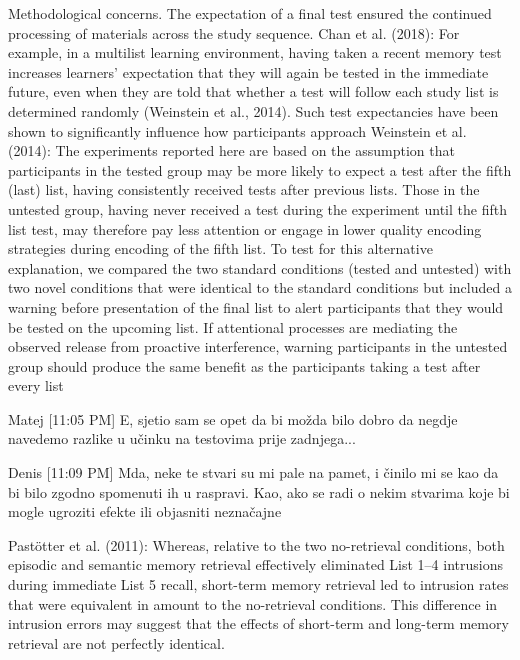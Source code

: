 \documentclass[../main.tex]{subfiles}
\begin{document}
Methodological concerns. The expectation of a final test ensured the
continued processing of materials across the study sequence.
Chan et al. (2018): %
For example, in a multilist learning environment, having taken a
recent memory test increases learners’ expectation that they will
again be tested in the immediate future, even when they are told
that whether a test will follow each study list is determined
randomly (Weinstein et al., 2014). Such test expectancies have
been shown to significantly influence how participants approach
Weinstein et al. (2014):
The experiments reported here are based on the assumption that
participants in the tested group may be more likely to expect a test
after the fifth (last) list, having consistently received tests after
previous lists. Those in the untested group, having never received
a test during the experiment until the fifth list test, may therefore
pay less attention or engage in lower quality encoding strategies
during encoding of the fifth list. To test for this alternative explanation, 
we compared the two standard conditions (tested and
untested) with two novel conditions that were identical to the
standard conditions but included a warning before presentation of
the final list to alert participants that they would be tested on the
upcoming list. If attentional processes are mediating the observed
release from proactive interference, warning participants in the
untested group should produce the same benefit as the participants
taking a test after every list


Matej [11:05 PM]
E, sjetio sam se opet da bi možda bilo dobro da negdje navedemo razlike u učinku na testovima prije zadnjega...

Denis [11:09 PM]
Mda, neke te stvari su mi pale na pamet, i činilo mi se kao da bi bilo zgodno spomenuti ih u raspravi. Kao, ako se radi o nekim stvarima koje bi mogle ugroziti efekte ili objasniti neznačajne



Pastötter et al. (2011):
Whereas, relative to the two no-retrieval conditions,
both episodic and semantic memory retrieval effectively
eliminated List 1–4 intrusions during immediate List 5 recall,
short-term memory retrieval led to intrusion rates that were equivalent
in amount to the no-retrieval conditions. This difference in
intrusion errors may suggest that the effects of short-term and
long-term memory retrieval are not perfectly identical.
\end{document}
